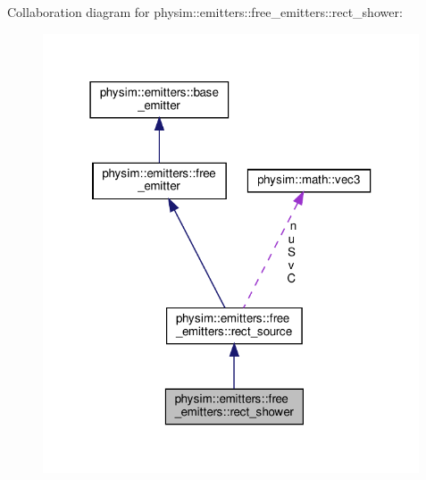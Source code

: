 Collaboration diagram for physim\+:\+:emitters\+:\+:free\+\_\+emitters\+:\+:rect\+\_\+shower\+:\nopagebreak
\begin{figure}[H]
\begin{center}
\leavevmode
\includegraphics[width=316pt]{classphysim_1_1emitters_1_1free__emitters_1_1rect__shower__coll__graph}
\end{center}
\end{figure}
